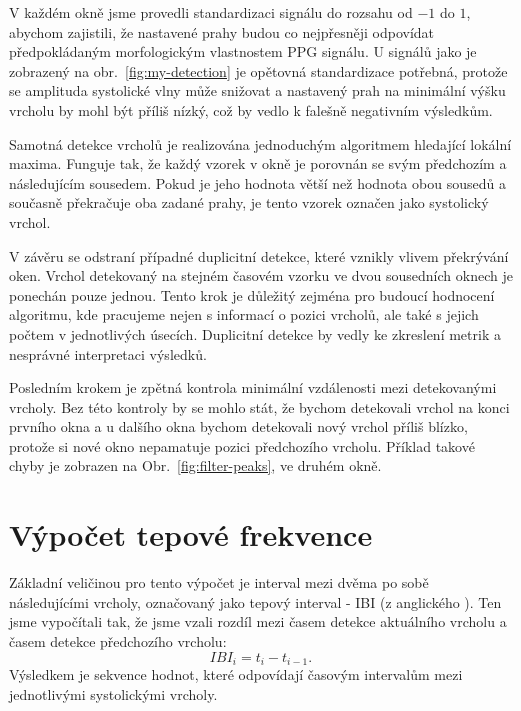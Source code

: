 V každém okně jsme provedli standardizaci signálu do rozsahu od \(-1\) do \(1\), abychom zajistili, že nastavené prahy budou co nejpřesněji odpovídat předpokládaným morfologickým vlastnostem PPG signálu.
U signálů jako je zobrazený na obr.~\ref{fig:my-detection} je opětovná standardizace potřebná, protože se amplituda systolické vlny může snižovat a nastavený prah na minimální výšku vrcholu by mohl být příliš nízký, což by vedlo k falešně negativním výsledkům.

Samotná detekce vrcholů je realizována jednoduchým algoritmem hledající lokální maxima.
Funguje tak, že každý vzorek v okně je porovnán se svým předchozím a následujícím sousedem.
Pokud je jeho hodnota větší než hodnota obou sousedů a současně překračuje oba zadané prahy, je tento vzorek označen jako systolický vrchol.

V závěru se odstraní případné duplicitní detekce, které vznikly vlivem překrývání oken.
Vrchol detekovaný na stejném časovém vzorku ve dvou sousedních oknech je ponechán pouze jednou.
Tento krok je důležitý zejména pro budoucí hodnocení algoritmu, kde pracujeme nejen s informací o pozici vrcholů, ale také s jejich počtem v jednotlivých úsecích.
Duplicitní detekce by vedly ke zkreslení metrik a nesprávné interpretaci výsledků.

Posledním krokem je zpětná kontrola minimální vzdálenosti mezi detekovanými vrcholy.
Bez této kontroly by se mohlo stát, že bychom detekovali vrchol na konci prvního okna a u dalšího okna bychom detekovali nový vrchol příliš blízko, protože si nové okno nepamatuje pozici předchozího vrcholu.
Příklad takové chyby je zobrazen na Obr.~\ref{fig:filter-peaks}, ve druhém okně.

\section{Výpočet tepové frekvence}
\label{sec:alg_hr}
Základní veličinou pro tento výpočet je interval mezi dvěma po sobě následujícími vrcholy, označovaný jako tepový interval - \acs{IBI} (z anglického ).
Ten jsme vypočítali tak, že jsme vzali rozdíl mezi časem detekce aktuálního vrcholu a časem detekce předchozího vrcholu:
\begin{equation}
	\label{eq:IBI}
	IBI_{i} = t_{i} - t_{i-1}.
\end{equation}
Výsledkem je sekvence hodnot, které odpovídají časovým intervalům mezi jednotlivými systolickými vrcholy.

